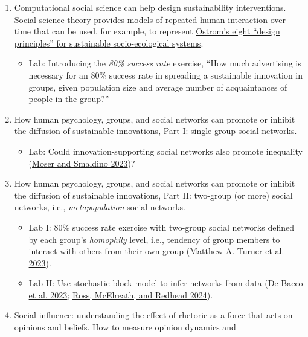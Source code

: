 \documentclass[
]{article}
\providecommand{\tightlist}{%
  \setlength{\itemsep}{0pt}\setlength{\parskip}{0pt}}
\begin{document}
\begin{enumerate}
\def\labelenumi{\arabic{enumi}.}
\item
  Computational social science can help design sustainability
  interventions. Social science theory provides models of repeated human
  interaction over time that can be used, for example, to represent
  \href{https://earthbound.report/2018/01/15/elinor-ostroms-8-rules-for-managing-the-commons/}{Ostrom's
  eight ``design principles'' for sustainable socio-ecological systems}.

  \begin{itemize}
  \tightlist
  \item
    Lab: Introducing the \emph{80\% success rate} exercise, ``How much
    advertising is necessary for an 80\% success rate in spreading a
    sustainable innovation in groups, given population size and average
    number of acquaintances of people in the group?''
  \end{itemize}
\item
  How human psychology, groups, and social networks can promote or
  inhibit the diffusion of sustainable innovations, Part I: single-group
  social networks.

  \begin{itemize}
  \tightlist
  \item
    Lab: Could innovation-supporting social networks also promote
    inequality {(\hyperref[ref-Moser2023]{Moser and Smaldino 2023})}?
  \end{itemize}
\item
  How human psychology, groups, and social networks can promote or
  inhibit the diffusion of sustainable innovations, Part II: two-group
  (or more) social networks, i.e., \emph{metapopulation} social
  networks.

  \begin{itemize}
  \item
    Lab I: 80\% success rate exercise with two-group social networks
    defined by each group's \emph{homophily} level, i.e., tendency of
    group members to interact with others from their own group
    {(\hyperref[ref-Turner2023]{Matthew A. Turner et al. 2023})}.
  \item
    Lab II: Use stochastic block model to infer networks from data
    {(\hyperref[ref-DeBacco2023]{De Bacco et al. 2023};
    \hyperref[ref-Ross2024]{Ross, McElreath, and Redhead 2024})}.
  \end{itemize}
\item
  Social influence: understanding the effect of rhetoric as a force that
  acts on opinions and beliefs. How to measure opinion dynamics and


\end{enumerate}
\end{document}
